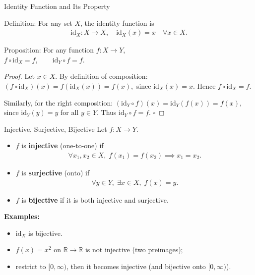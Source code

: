 \begin{frame}{Identity Function and Its Property}
\vspace{-0.4cm}
\begin{block}{Definition:} For any set \(X\), the identity function is
\begin{align*}
\mathrm{id}_X: X \to X, \quad \mathrm{id}_X(x) = x \quad \forall x \in X.
\end{align*}
\end{block}

\vspace{-0.5cm}
\begin{block}{Proposition:}
For any function \( f: X \to Y \),\\ $f \circ \mathrm{id}_X = f, \qquad \mathrm{id}_Y \circ f = f.$
\end{block}
\vspace{-0.4cm}
\begin{proof}
Let \(x \in X\).
By definition of composition: $
(f \circ \mathrm{id}_X)(x) = f(\mathrm{id}_X(x)) = f(x),$  since \(\mathrm{id}_X(x) = x\).
Hence \(f \circ \mathrm{id}_X = f.\)

Similarly, for the right composition: $(\mathrm{id}_Y \circ f)(x) = \mathrm{id}_Y(f(x)) = f(x),$ since \(\mathrm{id}_Y(y) = y\) for all \(y \in Y\).
Thus \(\mathrm{id}_Y \circ f = f.\) \(\square\)
\end{proof}
\end{frame}

\begin{frame}{Injective, Surjective, Bijective}
Let \(f: X \to Y\).

\begin{itemize}
  \item \(f\) is \textbf{injective} (one-to-one) if
  \begin{align*}
    \forall x_1, x_2 \in X,\; f(x_1) = f(x_2) \implies x_1 = x_2.
  \end{align*}
  \item \(f\) is \textbf{surjective} (onto) if
  \begin{align*}
    \forall y \in Y,\; \exists x \in X,\; f(x) = y.
  \end{align*}
  \item \(f\) is \textbf{bijective} if it is both injective and surjective.
\end{itemize}

\textbf{Examples:}
\begin{itemize}
    \item \(\mathrm{id}_X\) is bijective.
    \item \(f(x) = x^2\) on \(\mathbb{R} \to \mathbb{R}\) is not injective (two preimages);
    \item restrict to \([0,\infty)\), then it becomes injective (and bijective onto \([0,\infty)\)).
\end{itemize}
\end{frame}


